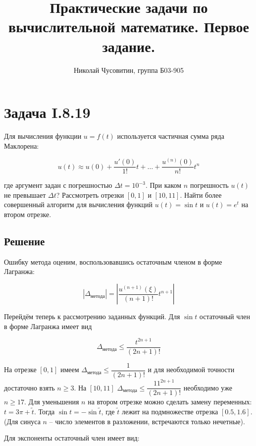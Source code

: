 \documentclass[a4paper,12pt]{article}
\title{Практические задачи по вычислительной математике. Первое задание.}
\author{Николай Чусовитин, группа Б03-905}
\date{}
\begin{document}
\maketitle

\section*{Задача I.8.19}

Для вычисления функции $u = f(t)$ используется частичная сумма ряда Маклорена:

\begin{equation*}
    u(t) \approx u(0) + \frac{u'(0)}{1!} t + \dots + \frac{u^{(n)} (0)}{n!} t^n
\end{equation*}

\noindent
где аргумент задан с погрешностью $\Delta t = 10^{-3}$. При каком $n$ погрешность $u(t)$ не превышает $\Delta t$? Рассмотреть отрезки $[0, 1]$ и $[10, 11]$. Найти более совершенный алгоритм для вычисления функций $u(t) =\sin t$ и $u(t) = e^t$ на втором отрезке.

\subsection*{Решение}

Ошибку метода оценим, воспользовавшись остаточным членом в форме Лагранжа:

\begin{equation*}
    | \Delta_\text{метода} | = \left| \frac{u^{(n + 1)} (\xi)}{(n + 1)!} t^{n + 1} \right|
\end{equation*}

Перейдём теперь к рассмотрению заданных функций. Для $\sin t$ остаточный член в форме Лагранжа имеет вид

\begin{equation*}
    \Delta_\text{метода} \leq \frac{t^{2n + 1}}{(2n + 1)!}
\end{equation*}

На отрезке $[0, 1]$ имеем $\Delta_\text{метода} \leq \dfrac{1}{(2n + 1)!}$ и для необходимой точности достаточно взять $n \geq 3$. На $[10, 11]$ $\Delta_\text{метода} \leq \dfrac{11^{2n + 1}}{(2n + 1)!}$ необходимо уже $n \geq 17$. Для уменьшения $n$ на втором отрезке можно сделать замену переменных: $t = 3 \pi + \tilde{t}$. Тогда $\sin t = - \sin \tilde{t}$, где $\tilde{t}$ лежит на подмножестве отрезка $[0.5, 1.6]$. (Для синуса $n$ -- число элементов в разложении, встречаются только нечетные).

Для экспоненты остаточный член имеет вид:
\end{document}
